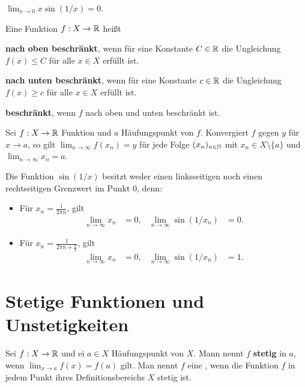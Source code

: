 \begin{bsp}
	$\lim_{x \to 0} x \sin ( 1/x) = 0$. 
\end{bsp} 


\begin{defn}
	Eine Funktion $f : X \to \mathbb{R}$ heißt
	\begin{enuma}
		\item \textbf{nach oben beschränkt}, wenn für eine Konstante $C \in \mathbb{R}$ die Ungleichung $f(x) \le C$ für alle $x \in X$ erfüllt ist. 
		\item \textbf{nach unten beschränkt}, wenn für eine Konstante $c \in \mathbb{R}$ die Ungleichung $f(x) \ge c$ für alle $x \in X$ erfüllt ist. 
		\item \textbf{beschränkt}, wenn $f$ nach oben und unten beschränkt ist. 
	\end{enuma} 
\end{defn} 

\begin{thm}
	Sei $f : X \to \mathbb{R}$ Funktion und $a$ Häufungspunkt von $f$. Konvergiert $f$ gegen $y$ für $x \to a$, so gilt $\lim_{n \to \infty} f(x_n) = y$ für jede Folge $(x_n)_{n \in \mathbb{N}}$ mit $x_n \in X \setminus \{a\}$ und $\lim_{n \to \infty} x_n  = a$. 
\end{thm} 

\begin{bsp} 
	Die Funktion $\sin(1/x)$ besitzt weder einen linksseitigen noch einen rechtseitigen Grenzwert im Punkt $0$, denn:  
	
	\begin{itemize}
		\item[] Für $x_n = \frac{1}{2 \pi n}$, gilt 
		\begin{align*}
			\lim_{n \to \infty} x_n & = 0,  & \lim_{n \to \infty} \sin(1/x_n) & = 0.
		\end{align*}
		\item[] Für $x_n = \frac{1}{2 \pi n + \frac{\pi}{2}}$, gilt \begin{align*}
				\lim_{n \to \infty} x_n & = 0, & \lim_{n \to \infty} \sin(1/x_n) & = 1. 
		\end{align*}
	\end{itemize} 
\end{bsp} 


\section{Stetige Funktionen und Unstetigkeiten} 

\begin{defn}
	Sei $f : X \to \mathbb{R}$ und 
	ei $a \in X$ Häufungspunkt von $X$. Mann nennt $f$ \textbf{stetig} in $a$, wenn $\lim_{x \to a} f(x) = f(a)$ gilt. Man nennt $f$ eine , wenn die Funktion $f$ in jedem Punkt ihres Definitionsbereichs $X$ stetig ist. 
\end{defn} 

